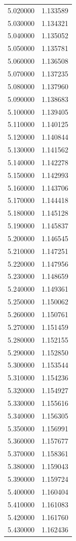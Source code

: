 \begin{tabular}{rr}
5.020000 & 1.133589 \\
5.030000 & 1.134321 \\
5.040000 & 1.135052 \\
5.050000 & 1.135781 \\
5.060000 & 1.136508 \\
5.070000 & 1.137235 \\
5.080000 & 1.137960 \\
5.090000 & 1.138683 \\
5.100000 & 1.139405 \\
5.110000 & 1.140125 \\
5.120000 & 1.140844 \\
5.130000 & 1.141562 \\
5.140000 & 1.142278 \\
5.150000 & 1.142993 \\
5.160000 & 1.143706 \\
5.170000 & 1.144418 \\
5.180000 & 1.145128 \\
5.190000 & 1.145837 \\
5.200000 & 1.146545 \\
5.210000 & 1.147251 \\
5.220000 & 1.147956 \\
5.230000 & 1.148659 \\
5.240000 & 1.149361 \\
5.250000 & 1.150062 \\
5.260000 & 1.150761 \\
5.270000 & 1.151459 \\
5.280000 & 1.152155 \\
5.290000 & 1.152850 \\
5.300000 & 1.153544 \\
5.310000 & 1.154236 \\
5.320000 & 1.154927 \\
5.330000 & 1.155616 \\
5.340000 & 1.156305 \\
5.350000 & 1.156991 \\
5.360000 & 1.157677 \\
5.370000 & 1.158361 \\
5.380000 & 1.159043 \\
5.390000 & 1.159724 \\
5.400000 & 1.160404 \\
5.410000 & 1.161083 \\
5.420000 & 1.161760 \\
5.430000 & 1.162436 \\

\end{tabular}
